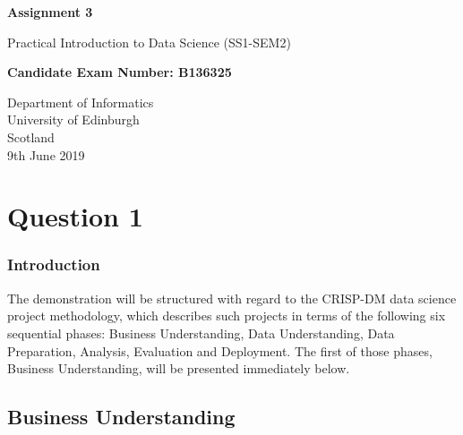 \documentclass[12pt, oneside, openany]{book}
\begin{document}
    \frontmatter

\begin{titlepage}
   \begin{center}
       \vspace*{1cm}
 
       \textbf{Assignment 3}
 
       \vspace{0.5cm}
        Practical Introduction to Data Science (SS1-SEM2)
 
       \vspace{1.5cm}
 
       \textbf{Candidate Exam Number: B136325}
 
       \vfill
 
       \vspace{0.8cm}
 
       Department of Informatics\\
       University of Edinburgh\\
       Scotland\\
       9th June 2019
 
   \end{center}
\end{titlepage}
    \pagestyle{plain}

    \tableofcontents

    \mainmatter

    \pagestyle{plain}

\setcounter{equation}{0}
\chapter*{Question 1}

\subsection*{Introduction}
The demonstration will be structured with regard to the CRISP-DM data science project methodology, which describes such projects in terms of the following six sequential phases: Business Understanding, Data Understanding, Data Preparation, Analysis, Evaluation and Deployment. The first of those phases, Business Understanding, will be presented immediately below.

\section*{Business Understanding}
\end{document}
